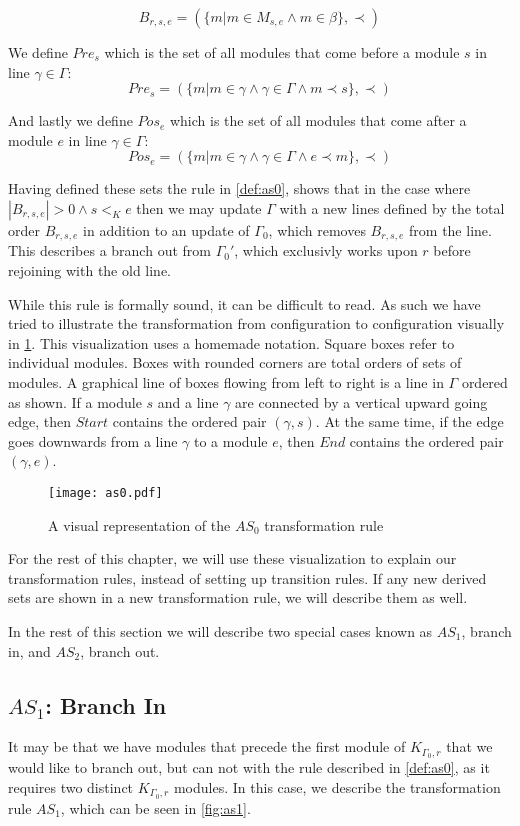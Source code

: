 \[B_{r,s,e} = (\{m |m \in M_{s,e} \land m \in \beta\}, \prec)\]

We define $Pre_{s}$ which is the set of all modules that come before a module $s$ in line $\gamma \in \Gamma$:
\[Pre_{s} = (\{m | m \in \gamma \land \gamma \in \Gamma \land m \prec s\}, \prec)\]

And lastly we define $Pos_{e}$ which is the set of all modules that come after a module $e$  in line $\gamma \in \Gamma$:
\[Pos_{e} = (\{m | m \in \gamma \land \gamma \in \Gamma \land e \prec  m \}, \prec)\]

Having defined these sets the rule in \cref{def:as0}, shows that in the case where $|B_{r,s,e}| > 0 \land s <_K e$ then we may update $\Gamma$ with a new lines defined by the total order $B_{r,s,e}$ in addition to an update of $\Gamma_0$, which removes $B_{r,s,e}$ from the line. This describes a branch out from $\Gamma_0'$, which exclusivly works upon $r$ before rejoining with the old line.   

While this rule is formally sound, it can be difficult to read. As such we have tried to illustrate the transformation from configuration to configuration visually in \cref{fig:as0}. This visualization uses a homemade notation. Square boxes refer to individual modules. Boxes with rounded corners are total orders of sets of modules. A graphical line of boxes flowing from left to right is a line in $\Gamma$ ordered as shown. If a module $s$ and a line $\gamma$ are connected by a vertical upward going edge, then $Start$ contains the ordered pair $(\gamma ,s)$. At the same time, if the edge goes downwards from a line $\gamma$ to a module $e$, then $End$ contains the ordered pair $(\gamma ,e)$.


\begin{figure}[H]
\centering
\texttt{[image: as0.pdf]}
\caption{A visual representation of the $AS_0$ transformation rule}
\label{fig:as0}
\end{figure}

For the rest of this chapter, we will use these visualization to explain our transformation rules, instead of setting up transition rules. If any new derived sets are shown in a new transformation rule, we will describe them as well.  

In the rest of this section we will describe two special cases known as $AS_1$, branch in, and $AS_2$, branch out. 

\subsection{$AS_1$: Branch In}\label{sssec:bi}
It may be that we have modules that precede the first module of $K_{\Gamma_0 ,r}$ that we would like to branch out, but can not with the rule described in \cref{def:as0}, as it requires two distinct $K_{\Gamma_0 ,r}$ modules. In this case, we describe the transformation rule $AS_1$, which can be seen in \cref{fig:as1}.

